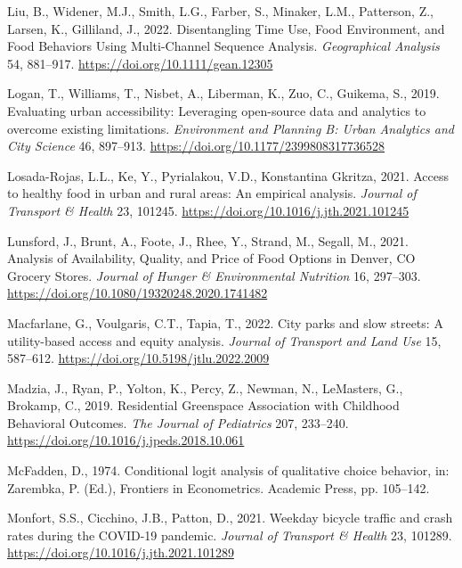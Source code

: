 \documentclass[
  letterpaper,
  DIV=11,
  numbers=noendperiod]{scrreport}
\newlength{\cslhangindent}
\newlength{\cslentryspacingunit} %
\newenvironment{CSLReferences}[2] %
 {%
  \setlength{\parindent}{0pt}
  \ifodd #1
  \let\oldpar\par
  \def\par{\hangindent=\cslhangindent\oldpar}
  \fi
  \setlength{\parskip}{#2\cslentryspacingunit}
 }%
 {}
\begin{document}
\begin{CSLReferences}{1}{0}
\leavevmode{}%
Liu, B., Widener, M.J., Smith, L.G., Farber, S., Minaker, L.M.,
Patterson, Z., Larsen, K., Gilliland, J., 2022. Disentangling {Time
Use}, {Food Environment}, and {Food Behaviors Using Multi-Channel
Sequence Analysis}. \emph{Geographical Analysis} 54, 881--917.
\url{https://doi.org/10.1111/gean.12305}

\leavevmode{}%
Logan, T., Williams, T., Nisbet, A., Liberman, K., Zuo, C., Guikema, S.,
2019. Evaluating urban accessibility: Leveraging open-source data and
analytics to overcome existing limitations. \emph{Environment and
Planning B: Urban Analytics and City Science} 46, 897--913.
\url{https://doi.org/10.1177/2399808317736528}

\leavevmode{}%
Losada-Rojas, L.L., Ke, Y., Pyrialakou, V.D., Konstantina Gkritza, 2021.
Access to healthy food in urban and rural areas: {An} empirical
analysis. \emph{Journal of Transport \& Health} 23, 101245.
\url{https://doi.org/10.1016/j.jth.2021.101245}

\leavevmode{}%
Lunsford, J., Brunt, A., Foote, J., Rhee, Y., Strand, M., Segall, M.,
2021. Analysis of {Availability}, {Quality}, and {Price} of {Food
Options} in {Denver}, {CO Grocery Stores}. \emph{Journal of Hunger \&
Environmental Nutrition} 16, 297--303.
\url{https://doi.org/10.1080/19320248.2020.1741482}

\leavevmode{}%
Macfarlane, G., Voulgaris, C.T., Tapia, T., 2022. City parks and slow
streets: {A} utility-based access and equity analysis. \emph{Journal of
Transport and Land Use} 15, 587--612.
\url{https://doi.org/10.5198/jtlu.2022.2009}

\leavevmode{}%
Madzia, J., Ryan, P., Yolton, K., Percy, Z., Newman, N., LeMasters, G.,
Brokamp, C., 2019. Residential {Greenspace Association} with {Childhood
Behavioral Outcomes}. \emph{The Journal of Pediatrics} 207, 233--240.
\url{https://doi.org/10.1016/j.jpeds.2018.10.061}

\leavevmode{}%
McFadden, D., 1974. Conditional logit analysis of qualitative choice
behavior, in: Zarembka, P. (Ed.), Frontiers in {Econometrics}. {Academic
Press}, pp. 105--142.

\leavevmode{}%
Monfort, S.S., Cicchino, J.B., Patton, D., 2021. Weekday bicycle traffic
and crash rates during the {COVID-19} pandemic. \emph{Journal of
Transport \& Health} 23, 101289.
\url{https://doi.org/10.1016/j.jth.2021.101289}


\end{CSLReferences}
\end{document}
